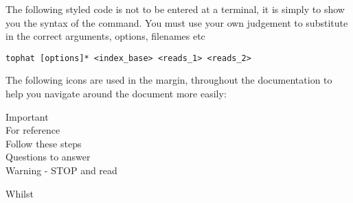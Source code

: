 The following styled code is not to be entered at a terminal, it is simply to show you the syntax of
the command. You must use your own judgement to substitute in the correct arguments, options,
filenames etc

\begin{lstlisting}[style=command_syntax]
tophat [options]* <index_base> <reads_1> <reads_2>
\end{lstlisting}

The following icons are used in the margin, throughout the documentation to help you navigate around
the document more easily:

\hspace*{.2cm} Important\\
\hspace*{.2cm} For reference\\
\hspace*{.2cm} Follow these steps\\
\hspace*{.2cm} Questions to answer\\
\hspace*{.2cm} Warning - STOP and read\\

\begin{information}
Whilst 
\end{information}
